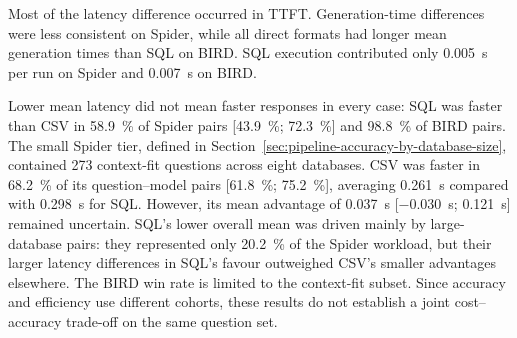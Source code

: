 Most of the latency difference occurred in TTFT. Generation-time differences were less consistent on Spider,
while all direct formats had longer mean generation times than SQL on BIRD. SQL execution contributed only
\qty{0.005}{\second} per run on Spider and \qty{0.007}{\second} on BIRD.

Lower mean latency did not mean faster responses in every case: SQL was faster than CSV in
\qty{58.9}{\percent} of Spider pairs [\qty{43.9}{\percent}; \qty{72.3}{\percent}] and \qty{98.8}{\percent} of
BIRD pairs. The small Spider tier, defined in Section~\ref{sec:pipeline-accuracy-by-database-size}, contained
\num{273} context-fit questions across eight databases. CSV was faster in \qty{68.2}{\percent} of its
question--model pairs [\qty{61.8}{\percent}; \qty{75.2}{\percent}], averaging \qty{0.261}{\second} compared
with \qty{0.298}{\second} for SQL. However, its mean advantage of \qty{0.037}{\second}
[\qty{-0.030}{\second}; \qty{0.121}{\second}] remained uncertain.
SQL's lower overall mean was driven mainly by large-database pairs: they represented only
\qty{20.2}{\percent} of the Spider workload, but their larger latency differences in SQL's favour outweighed
CSV's smaller advantages elsewhere. The BIRD win rate is limited to  the context-fit
subset. Since accuracy and efficiency use different cohorts, these results do not
establish a joint cost--accuracy trade-off on the same question set.

